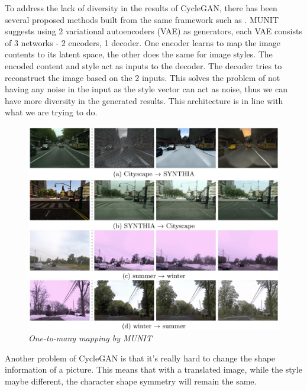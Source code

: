\documentclass[12pt]{report}
\begin{document}
To address the lack of diversity in the results of CycleGAN, there has been several proposed methods built from the same framework such as \cite{munit}\cite{bicycle-gan}\cite{disco-gan}\cite{bayesian-cyclegan}. MUNIT\cite{munit} suggests using 2 variational autoencoders (VAE) as generators, each VAE consists of 3 networks - 2 encoders, 1 decoder. One encoder learns to map the image contents to its latent space, the other does the same for image styles. The encoded content and style act as inputs to the decoder. The decoder tries to reconstruct the image based on the 2 inputs. This solves the problem of not having any noise in the input as the style vector can act as noise, thus we can have more diversity in the generated results. This architecture is in line with what we are trying to do.

\begin{figure}[h]
	\centering
	\includegraphics[scale=0.2]{street-munit}
	\caption{\textit{One-to-many mapping by MUNIT\cite{munit}}}
	\label{fig:street-munit}
\end{figure}

Another problem of CycleGAN is that it's really hard to change the shape information of a picture. This means that with a translated image, while the style maybe different, the character shape symmetry will remain the same.
\end{document}
